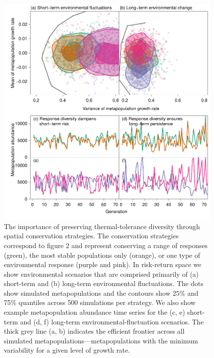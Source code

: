 \begin{figure}[htbp]
\centering
\includegraphics[width=4.5in]{metafolio/Fig4}
\caption[The importance of preserving thermal-tolerance diversity through spatial conservation strategies.]{The importance of preserving thermal-tolerance diversity through spatial conservation strategies. The conservation strategies correspond to figure 2 and represent conserving a range of responses (green), the most stable populations only (orange), or one type of environmental response (purple and pink). In risk-return space we show environmental scenarios that are comprised primarily of (a) short-term and (b) long-term environmental fluctuations. The dots show simulated metapopulations and the contours show 25\% and 75\% quantiles across 500 simulations per strategy. We also show example metapopulation abundance time series for the (c, e) short-term and (d, f) long-term environmental-fluctuation scenarios. The thick grey line (a, b) indicates the efficient frontier across all simulated metapopulations---metapopulations with the minimum variability for a given level of growth rate.} \label{f:sp}
\end{figure}

\clearpage


